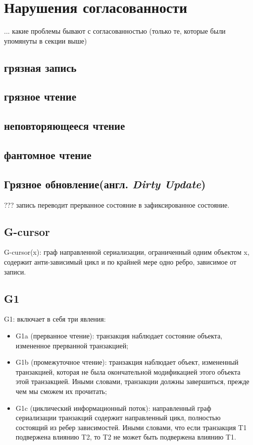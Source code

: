 \documentclass[12pt,  openany]{book}
\begin{document}
\section{Нарушения согласованности}
... какие проблемы бывают с согласованностью
(только те, которые были упомянуты в секции выше)

\subsection{грязная запись}
\subsection{грязное чтение}
\subsection{неповторяющееся чтение}
\subsection{фантомное чтение}
\subsection{Грязное обновление(англ. \textit{Dirty Update})}
???
запись переводит прерванное состояние в зафиксированное состояние.

\subsection{G-cursor}
G-cursor(x): граф направленной сериализации, ограниченный одним объектом x, содержит анти-зависимый цикл и по крайней мере одно ребро, зависимое от записи.

\subsection{G1}
G1: включает в себя три явления: 
\begin{itemize}
\item G1a (прерванное чтение): транзакция наблюдает состояние объекта, измененное прерванной транзакцией;
\item G1b (промежуточное чтение): транзакция наблюдает объект, измененный транзакцией, которая не была окончательной модификацией этого объекта этой транзакцией. Иными словами, транзакции должны завершиться, прежде чем мы сможем их прочитать;
\item G1c (циклический информационный поток): направленный граф сериализации транзакций содержит направленный цикл, полностью состоящий из ребер зависимостей. Иными словами, что если транзакция T1 подвержена влиянию T2, то T2 не может быть подвержена влиянию T1.
\end{itemize}
\end{document}
